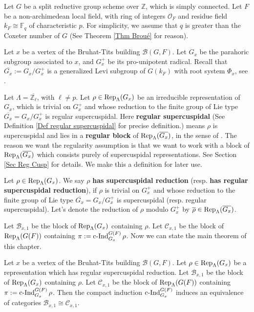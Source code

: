 		Let $G$ be a split reductive group scheme over $\mathbb{Z}$, which is simply connected. Let $F$ be a non-archimedean local field, with ring of integers $\mathcal{O}_F$ and residue field $k_F \cong \mathbb{F}_q$ of characteristic $p$. For simplicity, we assume that $q$ is greater than the Coxeter number of $G$ (See Theorem \ref{Thm Broué} for reason).
		
		Let $x$ be a vertex of the Bruhat-Tits building $\mathcal{B}(G, F)$. Let $G_x$ be the parahoric subgroup associated to $x$, and $G_x^+$ be its pro-unipotent radical. Recall that $\overline{G_x}:=G_x/G_x^+$ is a generalized Levi subgroup of $G(k_F)$ with root system $\Phi_x$, see \cite[Theorem 3.17]{rabinoff2003bruhat}. 
		
		Let $\Lambda=\overline{\mathbb{Z}_\ell}$, with $\ell \neq p$. Let $\rho \in \operatorname{\operatorname{Rep}}_{\Lambda}(G_x)$ be an irreducible representation of $G_x$, which is trivial on $G_x^+$ and whose reduction to the finite group of Lie type $\overline{G_x}=G_x/G_x^+$ is  
		regular supercuspidal. Here \textbf{regular supercuspidal} (See Definition \ref{Def regular supercuspidal} for precise definition.) means $\rho$ is supercuspidal and lies in a \textbf{regular block} of $\operatorname{\operatorname{Rep}}_{\Lambda}(\overline{G_x})$, in the sense of \cite{broue1990isometries}. The reason we want the regularity assumption is that we want to work with a block of $\operatorname{\operatorname{Rep}}_{\Lambda}(\overline{G_x})$ which consists purely of supercuspidal representations. See Section \ref{Sec Reg Cusp} for details. We make this a definition for later use.
		
		\begin{definition}
			Let $\rho \in \operatorname{\operatorname{Rep}}_{\Lambda}(G_x)$. We say $\rho$ \textbf{has supercuspidal reduction} (resp. \textbf{has regular supercuspidal reduction}), if $\rho$ is trivial on $G_x^+$ and whose reduction to the finite group of Lie type $\overline{G_x}=G_x/G_x^+$ is supercuspidal (resp. regular supercuspidal). Let's denote the reduction of $\rho$ modulo $G_x^+$ by $\overline{\rho} \in \operatorname{\operatorname{Rep}}_{\Lambda}(\overline{G_x})$.
		\end{definition}
		
		Let $\mathcal{B}_{x,1}$ be the block of $\operatorname{\operatorname{Rep}}_{\Lambda}(G_x)$ containing $\rho$. Let $\mathcal{C}_{x,1}$ be the block of $\operatorname{\operatorname{Rep}}_{\Lambda}(G(F))$ containing $\pi:=\operatorname{\operatorname{c-Ind}}_{G_x}^{G(F)}\rho$. Now we can state the main theorem of this chapter.
		
		\begin{theorem}\label{Thm Main}
			Let $x$ be a vertex of the Bruhat-Tits building $\mathcal{B}(G, F)$. Let $\rho \in \operatorname{\operatorname{Rep}}_{\Lambda}(G_x)$ be a representation which has regular supercuspidal reduction. Let $\mathcal{B}_{x,1}$ be the block of $\operatorname{\operatorname{Rep}}_{\Lambda}(G_x)$ containing $\rho$. Let $\mathcal{C}_{x,1}$ be the block of $\operatorname{\operatorname{Rep}}_{\Lambda}(G(F))$ containing $\pi:=\operatorname{\operatorname{c-Ind}}_{G_x}^{G(F)}\rho$. Then the compact induction $\operatorname{\operatorname{c-Ind}}_{G_x}^{G(F)}$ induces an equivalence of categories $\mathcal{B}_{x,1} \cong \mathcal{C}_{x,1}$. 
		\end{theorem}
		
